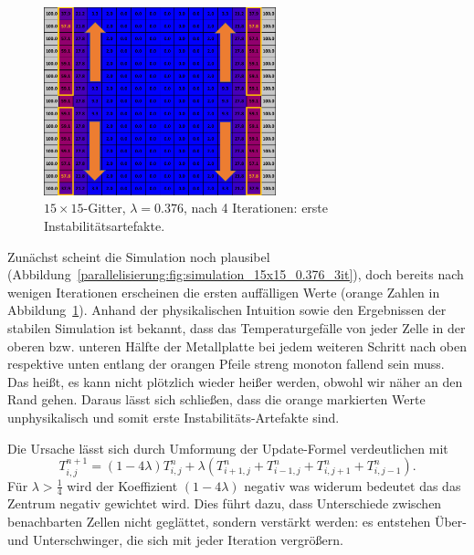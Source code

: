\begin{figure}[htbp]
	\centering
	\includegraphics[width=0.6\textwidth]{papers/parallelisierung/images/simulation_15x15_0.376_4it.pdf}
	\caption{\(15\times 15\)-Gitter, \(\lambda = 0.376\), nach 4 Iterationen: erste Instabilitätsartefakte.}
	\label{parallelisierung:fig:simulation_15x15_0.376_4it}
\end{figure}

Zunächst scheint die Simulation noch plausibel (Abbildung~\ref{parallelisierung:fig:simulation_15x15_0.376_3it}), doch bereits nach wenigen Iterationen erscheinen die ersten auffälligen Werte (orange Zahlen in Abbildung~\ref{parallelisierung:fig:simulation_15x15_0.376_4it}). Anhand der physikalischen Intuition sowie den Ergebnissen der stabilen Simulation ist bekannt, dass das Temperaturgefälle von jeder Zelle in der oberen bzw. unteren Hälfte der Metallplatte bei jedem weiteren Schritt nach oben respektive unten entlang der orangen Pfeile streng monoton fallend sein muss. Das heißt, es kann nicht plötzlich wieder heißer werden, obwohl wir näher an den Rand gehen. Daraus lässt sich schließen, dass die orange markierten Werte unphysikalisch und somit erste Instabilitäts-Artefakte sind.


Die Ursache lässt sich durch Umformung der Update-Formel verdeutlichen mit
\begin{equation}
	T_{i,j}^{n+1}
	=
	(1-4\lambda)T_{i,j}^n +
	\lambda \left(
	T_{i+1,j}^n + T_{i-1,j}^n + T_{i,j+1}^n + T_{i,j-1}^n
	\right).
\end{equation}
Für \(\lambda > \tfrac14\) wird der Koeffizient \((1-4\lambda)\) negativ was widerum bedeutet das das Zentrum negativ gewichtet wird.  
Dies führt dazu, dass Unterschiede zwischen benachbarten Zellen nicht geglättet, sondern verstärkt werden: es entstehen Über- und Unterschwinger, die sich mit jeder Iteration vergrößern.

